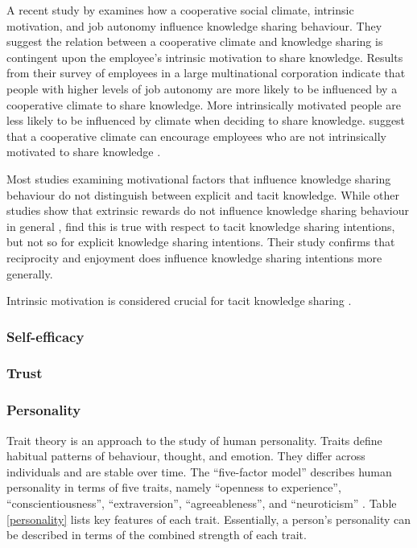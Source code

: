 A recent study by \citet{llopis2016understanding} examines how a cooperative social climate, intrinsic motivation, and job autonomy influence knowledge sharing behaviour. They suggest the relation between a cooperative climate and knowledge sharing is contingent upon the employee's intrinsic motivation to share knowledge. Results from their survey of employees in a large multinational corporation indicate that people with higher levels of job autonomy are more likely to be influenced by a cooperative climate to share knowledge. More intrinsically motivated people are less likely to be influenced by climate when deciding to share knowledge. \citet{llopis2016understanding} suggest that a cooperative climate can encourage employees who are not intrinsically motivated to share knowledge . \medskip

Most studies examining motivational factors that influence knowledge sharing behaviour do not distinguish between explicit and tacit knowledge. While other studies show that extrinsic rewards do not influence knowledge sharing behaviour in general \citep[e.g.][]{bock2001breaking,bock2005behavioral,lin2007effects}, \citet{hau2013effects} find this is true with respect to tacit knowledge sharing intentions, but not so for explicit knowledge sharing intentions. Their study confirms that reciprocity and enjoyment does influence knowledge sharing intentions more generally. \medskip

Intrinsic motivation is considered crucial for tacit knowledge sharing \citep{osterloh2000motivation}. 

\subsubsection{Self-efficacy}


\subsubsection{Trust}



\subsubsection{Personality}

Trait theory is an approach to the study of human personality. Traits define habitual patterns of behaviour, thought, and emotion. They differ across individuals and are stable over time. The \enquote{five-factor model} describes human personality in terms of five traits, namely \enquote{openness to experience}, \enquote{conscientiousness}, \enquote{extraversion}, \enquote{agreeableness}, and \enquote{neuroticism} \citep{mccrae1992introduction}. Table \ref{personality} lists key features of each trait. Essentially, a person's personality can be described in terms of the combined strength of each trait. \medskip 

